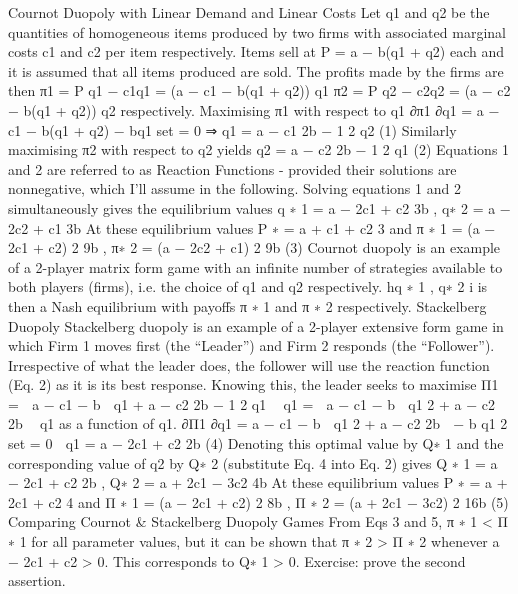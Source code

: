 Cournot Duopoly with Linear Demand and Linear Costs
Let q1 and q2 be the quantities of homogeneous items produced by two firms with associated
marginal costs c1 and c2 per item respectively.
Items sell at P = a − b(q1 + q2) each and it is assumed that all items produced are sold.
The profits made by the firms are then
π1 = P q1 − c1q1 = (a − c1 − b(q1 + q2)) q1
π2 = P q2 − c2q2 = (a − c2 − b(q1 + q2)) q2
respectively.
Maximising π1 with respect to q1
∂π1
∂q1
= a − c1 − b(q1 + q2) − bq1
set = 0
⇒ q1 =
a − c1
2b
−
1
2
q2 (1)
Similarly maximising π2 with respect to q2 yields
q2 =
a − c2
2b
−
1
2
q1 (2)
Equations 1 and 2 are referred to as Reaction Functions - provided their solutions are
nonnegative, which I’ll assume in the following.
Solving equations 1 and 2 simultaneously gives the equilibrium values
q
∗
1 =
a − 2c1 + c2
3b
, q∗
2 =
a − 2c2 + c1
3b
At these equilibrium values
P
∗ =
a + c1 + c2
3
and
π
∗
1 =
(a − 2c1 + c2)
2
9b
, π∗
2 =
(a − 2c2 + c1)
2
9b
(3)
Cournot duopoly is an example of a 2-player matrix form game with an infinite number
of strategies available to both players (firms), i.e. the choice of q1 and q2 respectively.
hq
∗
1
, q∗
2
i is then a Nash equilibrium with payoffs π
∗
1
and π
∗
2
respectively.
Stackelberg Duopoly
Stackelberg duopoly is an example of a 2-player extensive form game in which Firm 1
moves first (the “Leader”) and Firm 2 responds (the “Follower”). Irrespective of what
the leader does, the follower will use the reaction function (Eq. 2) as it is its best response.
Knowing this, the leader seeks to maximise
Π1 =

a − c1 − b

q1 +
a − c2
2b
−
1
2
q1
 q1 =

a − c1 − b

q1
2
+
a − c2
2b
 q1
as a function of q1.
∂Π1
∂q1
= a − c1 − b

q1
2
+
a − c2
2b

− b
q1
2
set = 0
⇒ q1 =
a − 2c1 + c2
2b
(4)
Denoting this optimal value by Q∗
1
and the corresponding value of q2 by Q∗
2
(substitute
Eq. 4 into Eq. 2) gives
Q
∗
1 =
a − 2c1 + c2
2b
, Q∗
2 =
a + 2c1 − 3c2
4b
At these equilibrium values
P
∗ =
a + 2c1 + c2
4
and
Π
∗
1 =
(a − 2c1 + c2)
2
8b
, Π
∗
2 =
(a + 2c1 − 3c2)
2
16b
(5)
Comparing Cournot & Stackelberg Duopoly Games
From Eqs 3 and 5,
π
∗
1 < Π
∗
1
for all parameter values, but it can be shown that
π
∗
2 > Π
∗
2
whenever a − 2c1 + c2 > 0. This corresponds to Q∗
1 > 0.
Exercise: prove the second assertion.
